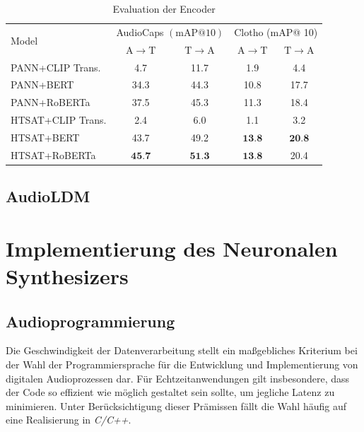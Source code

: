 \documentclass[
  a4paper,  %
  twoside,  %
  bibliography=totoc,
  headsepline,
  cleardoublepage=empty,
  parskip=half,
  draft=false
]{scrbook}
\begin{document}
\begin{table}[h]
  \centering
\begin{tabular}{lcc|cc}
\hline \multirow{2}{*}{ Model } & \multicolumn{2}{c|}{ AudioCaps $(\mathrm{mAP} @ 10)$} & \multicolumn{2}{c}{ Clotho (mAP@ 10) } \\
\cline { 2 - 5 } & $\mathrm{A} \rightarrow \mathrm{T}$ & $\mathrm{T} \rightarrow \mathrm{A}$ & $\mathrm{A} \rightarrow \mathrm{T}$ & $\mathrm{T} \rightarrow \mathrm{A}$ \\
\hline PANN+CLIP Trans. & 4.7 & 11.7 & 1.9 & 4.4 \\
PANN+BERT & 34.3 & 44.3 & 10.8 & 17.7 \\
PANN+RoBERTa & 37.5 & 45.3 & 11.3 & 18.4 \\
HTSAT+CLIP Trans. & 2.4 & 6.0 & 1.1 & 3.2 \\
HTSAT+BERT & 43.7 & 49.2 & $\mathbf{1 3 . 8}$ & $\mathbf{2 0 . 8}$ \\
HTSAT+RoBERTa & $\mathbf{4 5 . 7}$ & $\mathbf{5 1 . 3}$ & $\mathbf{1 3 . 8}$ & 20.4 \\
\hline
\end{tabular}
\caption[Encoder CLAP]{Evaluation der Encoder \cite{wu_large-scale_2023}}
  \label{tab:Clap}
\end{table}







\subsection{AudioLDM}

\section{Implementierung des Neuronalen Synthesizers}
\subsection{Audioprogrammierung}
Die Geschwindigkeit der Datenverarbeitung stellt ein maßgebliches Kriterium bei der Wahl der Programmiersprache für die Entwicklung und Implementierung von digitalen Audioprozessen dar. Für Echtzeitanwendungen gilt insbesondere, dass der Code so effizient wie möglich gestaltet sein sollte, um jegliche Latenz zu minimieren. Unter Berücksichtigung dieser Prämissen fällt die Wahl häufig auf eine Realisierung in \emph{C/C++}. \cite{doumler_c_2015, boulanger_audio_2011}
\end{document}
